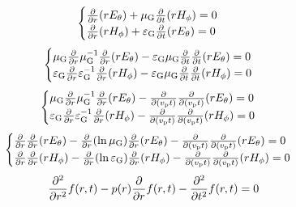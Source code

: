 \begin{equation}
    \begin{cases}
        \frac{\partial}{\partial r}(r{E}_\theta)+\mu_{\text{G}}\frac{\partial}{\partial t}(r{H}_\phi)=0\\
        \frac{\partial}{\partial r}(r{H}_\phi)+\varepsilon_{\text{G}}\frac{\partial}{\partial t}(r{E}_\theta)=0\\
    \end{cases}
\end{equation}
\begin{equation}
    \begin{cases}
        \mu_{\text{G}}\frac{\partial}{\partial r}\mu_{\text{G}}^{-1}\frac{\partial}{\partial r}(r{E}_\theta)-\varepsilon_{\text{G}}\mu_{\text{G}}\frac{\partial}{\partial t}\frac{\partial}{\partial t}(r{E}_\theta)=0\\
        \varepsilon_{\text{G}}\frac{\partial}{\partial r}\varepsilon_{\text{G}}^{-1}\frac{\partial}{\partial r}(r{H}_\phi)-\varepsilon_{\text{G}}\mu_{\text{G}}\frac{\partial}{\partial t}\frac{\partial}{\partial t}(r{H}_\phi)=0\\
    \end{cases}
\end{equation}
\begin{equation}
    \begin{cases}
        \mu_{\text{G}}\frac{\partial}{\partial r}\mu_{\text{G}}^{-1}\frac{\partial}{\partial r}(r{E}_\theta)-\frac{\partial}{\partial(v_\text{p}t)}\frac{\partial}{\partial(v_\text{p}t)}(r{E}_\theta)=0\\
        \varepsilon_{\text{G}}\frac{\partial}{\partial r}\varepsilon_{\text{G}}^{-1}\frac{\partial}{\partial r}(r{H}_\phi)-\frac{\partial}{\partial(v_\text{p}t)}\frac{\partial}{\partial(v_\text{p}t)}(r{H}_\phi)=0\\
    \end{cases}
\end{equation}
\begin{equation}
    \begin{cases}
        \frac{\partial}{\partial r}\frac{\partial}{\partial r}(r{E}_\theta)-\frac{\partial}{\partial r}(\ln\mu_{\text{G}})\frac{\partial}{\partial r}(r{E}_\theta)-\frac{\partial}{\partial(v_\text{p}t)}\frac{\partial}{\partial(v_\text{p}t)}(r{E}_\theta)=0\\
        \frac{\partial}{\partial r}\frac{\partial}{\partial r}(r{H}_\phi)-\frac{\partial}{\partial r}(\ln\varepsilon_{\text{G}})\frac{\partial}{\partial r}(r{H}_\phi)-\frac{\partial}{\partial(v_\text{p}t)}\frac{\partial}{\partial(v_\text{p}t)}(r{H}_\phi)=0\\
    \end{cases}
\end{equation}
\begin{equation}
    \frac{\partial^2}{\partial r^2}f(r,t)-p(r)\frac{\partial}{\partial r}f(r,t)-\frac{\partial^2}{\partial t^2}f(r,t)=0
\end{equation}
